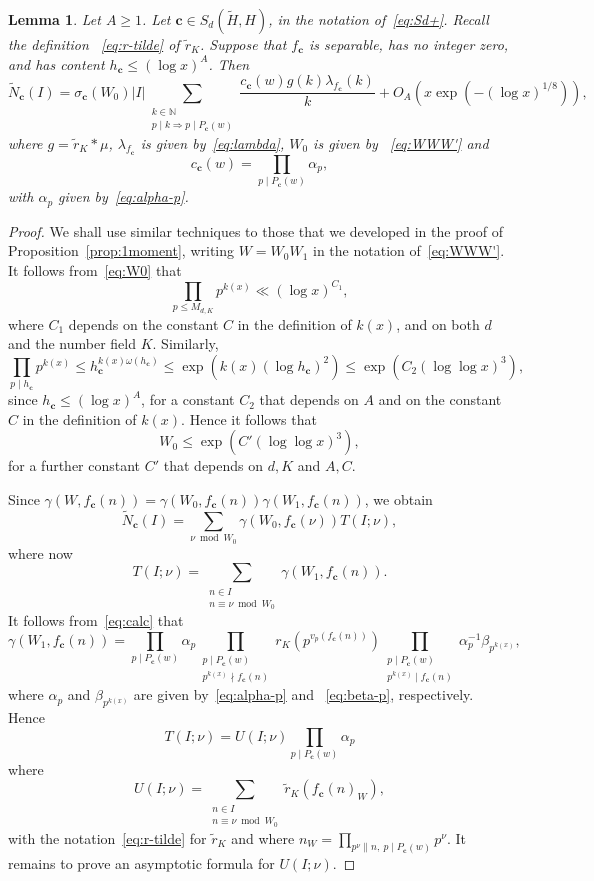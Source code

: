 \documentclass[11pt,letterpaper]{amsart}
\renewcommand{\leq}{\leqslant}
\renewcommand{\geq}{\geqslant}
\newtheorem{lemma}[theorem]{Lemma}
\theoremstyle{definition}
\numberwithin{equation}{section}
\newcommand\NN{\mathbb{N}}
\renewcommand{\c}{\mathbf{c}}
\newcommand{\0}{\mathbf{0}}
\begin{document}
\begin{lemma}\label{lem:tilde-N}
Let $A\geq 1$.
Let $\c\in S_d(\tilde H, H)$, in the notation of~\eqref{eq:Sd+}. 
Recall the definition ~\eqref{eq:r-tilde} of 
$\tilde r_K$.
Suppose that $f_\c$ is separable, has no integer zero, and has content $h_\c\leq (\log x)^A$.
Then
$$
\tilde N_\c(I) = 
\sigma_\c(W_0)|I| 
\sum_{\substack{k\in \NN\\ p\mid k \Rightarrow p\mid P_\c(w) }}
\frac{c_\c(w) g(k) 	
\lambda_{f_\c}(k)}{k}
+O_A\left(
x\exp\left(-(\log x)^{1/8}\right)\right),
$$
where $g=\tilde r_K*\mu$, $\lambda_{f_\c}$ is given by~\eqref{eq:lambda}, 
 $W_0$ is given by ~\eqref{eq:WWW'} and 
$$
c_\c(w)=\prod_{p\mid P_\c(w)} \alpha_p,
$$
with  $\alpha_p$  given by~\eqref{eq:alpha-p}.
\end{lemma}

\begin{proof}
We shall use 
similar techniques to those that we developed in the proof of 
Proposition~\ref{prop:1moment}, writing $W=W_0W_1$ in the notation of~\eqref{eq:WWW'}.
It follows from~\eqref{eq:W0} that 
$$
\prod_{p\leq M_{d,K}} p^{k(x)}\ll (\log x)^{C_1},
$$ 
where $C_1$  depends on the constant $C$ in the definition of $k(x)$, and on both $d$ and the number field $K$.
Similarly, 
$$
\prod_{p\mid h_\c} p^{k(x)}\leq h_\c^{k(x)\omega(h_\c)}\leq 
\exp\left(k(x)(\log h_\c)^2\right)\leq \exp\left(C_2(\log\log x)^3\right),
$$ 
since $h_\c\leq (\log x)^A$, 
for a constant $C_2$ that depends on $A$ and  
on the constant $C$ in the definition of $k(x)$. Hence it follows that 
\begin{equation}\label{eq:oat}
W_0\leq \exp\left(C'(\log\log x)^3\right),
\end{equation}
for a further constant $C'$ that depends on $d,K$ and $A,C$.


Since   $\gamma(W,f_\c(n))=\gamma(W_0,f_\c(n))\gamma(W_1,f_\c(n))$, we obtain
\begin{equation}\label{eq:S-to-T'}
\tilde N_{\c}(I)=
\sum_{\nu \bmod{W_0}} \gamma(W_0,f_\c(\nu))T(I;\nu), 
\end{equation}
where now
$$
T(I;\nu)=
\sum_{\substack{n\in I\\ 
n\equiv \nu\bmod{W_0}}}
\gamma(W_1,f_\c(n)).
$$
It follows from~\eqref{eq:calc} 
that 
$$
\gamma(W_1,f_\c(n))
=\prod_{p\mid P_\c(w)} \alpha_p
\prod_{\substack{p\mid P_\c(w)\\
p^{k(x)}\nmid f_\c(n)}}
r_K(p^{v_p(f_\c(n))}) 
\prod_{\substack{p\mid P_\c(w)\\
p^{k(x)}\mid f_\c(n)
}}
\alpha_p^{-1}\beta_{p^{k(x)}},
$$
where $\alpha_p$ and $ \beta_{p^{k(x)}}$ are given by~\eqref{eq:alpha-p} and ~\eqref{eq:beta-p}, 
respectively.
Hence
\begin{equation}\label{eq:pigeon}
T(I;\nu)=
U(I;\nu)\prod_{p\mid P_\c(w)} \alpha_p
\end{equation}
where
$$
U(I;\nu)=\sum_{\substack{n\in I
\\ n\equiv \nu\bmod{W_0}}} \tilde r_K(f_\c(n)_W),
$$
with the notation~\eqref{eq:r-tilde} for $\tilde r_K$ and where
$
n_W=\prod_{p^\nu \| n,~ p\mid P_\c(w)}p^\nu.
$
It remains to prove an asymptotic formula for $U(I;\nu)$.


\end{proof}
\end{document}
